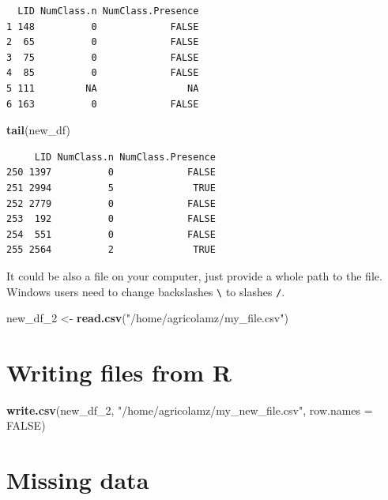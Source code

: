 \documentclass[]{book}
\newenvironment{Shaded}{\begin{snugshade}}{\end{snugshade}}
\newcommand{\KeywordTok}[1]{\textcolor[rgb]{0.13,0.29,0.53}{\textbf{#1}}}
\newcommand{\DataTypeTok}[1]{\textcolor[rgb]{0.13,0.29,0.53}{#1}}
\newcommand{\DecValTok}[1]{\textcolor[rgb]{0.00,0.00,0.81}{#1}}
\newcommand{\StringTok}[1]{\textcolor[rgb]{0.31,0.60,0.02}{#1}}
\newcommand{\OtherTok}[1]{\textcolor[rgb]{0.56,0.35,0.01}{#1}}
\newcommand{\NormalTok}[1]{#1}
\theoremstyle{definition}
\theoremstyle{definition}
\theoremstyle{definition}
\theoremstyle{remark}
\begin{document}
\begin{verbatim}
  LID NumClass.n NumClass.Presence
1 148          0             FALSE
2  65          0             FALSE
3  75          0             FALSE
4  85          0             FALSE
5 111         NA                NA
6 163          0             FALSE
\end{verbatim}

\begin{Shaded}
\begin{Highlighting}[]
\KeywordTok{tail}\NormalTok{(new_df)}
\end{Highlighting}
\end{Shaded}

\begin{verbatim}
     LID NumClass.n NumClass.Presence
250 1397          0             FALSE
251 2994          5              TRUE
252 2779          0             FALSE
253  192          0             FALSE
254  551          0             FALSE
255 2564          2              TRUE
\end{verbatim}

It could be also a file on your computer, just provide a whole path to
the file. Windows users need to change backslashes
\texttt{\textbackslash{}} to slashes \texttt{/}.

\begin{Shaded}
\begin{Highlighting}[]
\NormalTok{new_df_}\DecValTok{2}\NormalTok{ <-}\StringTok{ }\KeywordTok{read.csv}\NormalTok{(}\StringTok{"/home/agricolamz/my_file.csv"}\NormalTok{)}
\end{Highlighting}
\end{Shaded}

\section{Writing files from R}\label{writing-files-from-r}

\begin{Shaded}
\begin{Highlighting}[]
\KeywordTok{write.csv}\NormalTok{(new_df_}\DecValTok{2}\NormalTok{, }\StringTok{"/home/agricolamz/my_new_file.csv"}\NormalTok{,}
          \DataTypeTok{row.names =} \OtherTok{FALSE}\NormalTok{)}
\end{Highlighting}
\end{Shaded}

\section{Missing data}\label{missing-data}
\end{document}
